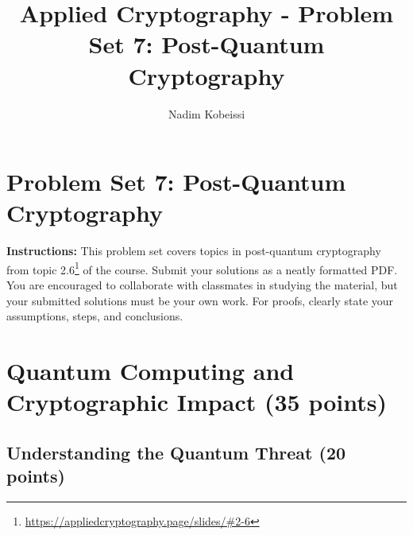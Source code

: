\documentclass[10pt,a4paper,american]{article}
\title{Applied Cryptography - Problem Set 7: Post-Quantum Cryptography}
\author{Nadim Kobeissi}
\begin{document}
\classhandoutheader
\section*{Problem Set 7: Post-Quantum Cryptography}

\begin{tcolorbox}[colframe=OliveGreen!30!white,colback=OliveGreen!5!white]
	\textbf{Instructions:} This problem set covers topics in post-quantum cryptography from topic 2.6\footnote{\url{https://appliedcryptography.page/slides/\#2-6}} of the course. Submit your solutions as a neatly formatted PDF. You are encouraged to collaborate with classmates in studying the material, but your submitted solutions must be your own work. For proofs, clearly state your assumptions, steps, and conclusions.
\end{tcolorbox}

\section{Quantum Computing and Cryptographic Impact (35 points)}

\subsection{Understanding the Quantum Threat (20 points)}
\end{document}

